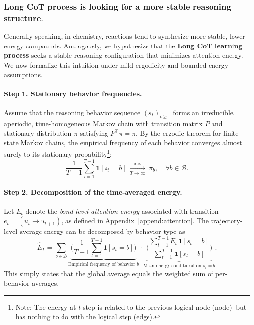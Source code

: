 \subsubsection{Long CoT process is looking for a more stable reasoning structure.}




Generally speaking, in chemistry, reactions tend to synthesize more stable, lower-energy compounds. Analogously, we hypothesize that the \textbf{Long CoT learning process} seeks a stable reasoning configuration that minimizes attention energy. We now formalize this intuition under mild ergodicity and bounded-energy assumptions.


\paragraph{Step 1. Stationary behavior frequencies.}  
Assume that the reasoning behavior sequence \((s_t)_{t\ge 1}\) forms an irreducible, aperiodic, time-homogeneous Markov chain with transition matrix \(P\) and stationary distribution \(\pi\) satisfying \(P^\top \pi = \pi\). By the ergodic theorem for finite-state Markov chains, the empirical frequency of each behavior converges almost surely to its stationary probability\footnote{Note: The energy at $t$ step is related to the previous logical node (node), but has nothing to do with the logical step (edge).}:
\begin{equation}
\frac{1}{T-1}\sum_{t=1}^{T-1}\mathbf{1}[s_t=b]
\;\xrightarrow[T\to\infty]{a.s.}\;
\pi_b, \quad \forall b \in \mathcal{B}.
\end{equation}\vspace{-5pt}

\paragraph{Step 2. Decomposition of the time-averaged energy.}  
Let \(E_t\) denote the \textit{bond-level attention energy} associated with transition \(e_t=(u_t \to u_{t+1})\), as defined in Appendix~\ref{append:attention}. The trajectory-level average energy can be decomposed by behavior type as
\begin{equation}
\widehat{E}_T
=\sum_{b\in\mathcal B}
\underbrace{\Biggl(\frac{1}{T-1}\sum_{t=1}^{T-1}\mathbf{1}[s_t=b]\Biggr)}_{\text{Empirical frequency of behavior $b$}}
\cdot
\underbrace{\Biggl(\frac{\sum_{t=1}^{T-1} E_t \,\mathbf{1}[s_t=b]}{\sum_{t=1}^{T-1}\mathbf{1}[s_t=b]}\Biggr)}_{\text{Mean energy conditional on }s_t=b}.
\end{equation}
This simply states that the global average equals the weighted sum of per-behavior averages.\vspace{-5pt}


